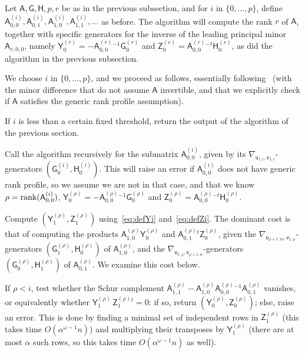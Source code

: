 \documentclass{sig-alternate}
\newcommand{\vu}{\ensuremath{\mathsf{u}}}
\newcommand{\vv}{\ensuremath{\mathsf{v}}}
\newcommand{\mA}{\ensuremath{\mathsf{A}}}
\newcommand{\mG}{\ensuremath{\mathsf{G}}}
\newcommand{\mH}{\ensuremath{\mathsf{H}}}
\newcommand{\mY}{\ensuremath{\mathsf{Y}}}
\newcommand{\mZ}{\ensuremath{\mathsf{Z}}}
\begin{document}
Let $\mA,\mG,\mH,p,r$ be as in the previous subsection, and for $i$ in
$\{0,\dots,p\}$, define
${\mA^{(i)}_{0,0}},\mA^{(i)}_{0,1},\mA^{(i)}_{1,0},\mA^{(i)}_{1,1},\dots$ as before.
The algorithm will compute the rank $r$ of $\mA$, together with
specific generators for the inverse of the leading principal minor
$\mA_{r,0,0}$, namely $\mY^{(r)}_0=-\mA^{(r)}_{0,0}{}^{-1} \mG^{(r)}_0$ and
  $\mZ^{(r)}_0=\mA^{(r)}_{0,0}{}^{-t}\mH^{(r)}_0$, as did the algorithm in the
  previous subsection.

We choose $i$ in $\{0,\dots,p\}$, and we proceed as follows,
essentially following~\cite{JeMo10} (with the minor difference that do
not assume $\mA$ invertible, and that we explicitly check if $\mA$
satisfies the generic rank profile assumption). 

\smallskip{} If $i$ is less than a certain fixed threshold, return the
output of the algorithm of the previous section.

\smallskip{} Call the algorithm recursively for the
submatrix ${\mA^{(i)}_{0,0}}$, given by its
$\nabla_{\vu_{1:i},\vv_{1:i}}$-generators
$(\mG^{(i)}_0,\mH^{(i)}_0)$. This will raise an error if
${\mA^{(i)}_{0,0}}$ does not have generic rank profile, so we assume
we are not in that case, and that we know $\rho={\rm
  rank}({\mA^{(i)}_{0,0}})$, $\mY^{(\rho)}_0=-\mA^{(\rho)}_{0,0}{}^{-1}
\mG^{(\rho)}_0$ and $\mZ^{(\rho)}_0=\mA^{(\rho)}_{0,0}{}^{-t}\mH^{(\rho)}_0$.

\smallskip{} Compute $(\mY^{(\rho)}_1,\mZ^{(\rho)}_1)$
using~\eqref{eq:defYi} and~\eqref{eq:defZi}. The dominant cost is that
of computing the products $\mA^{(\rho)}_{1,0} \mY^{(\rho)}_0$ and
$\mA^{(\rho)}_{0,1}{}^t \mZ^{(\rho)}_0$, given the
$\nabla_{\vu_{\rho+1:m},\vv_{1:\rho}}$-generators
$(\mG^{(\rho)}_1,\mH^{(\rho)}_0)$ of $\mA^{(\rho)}_{1,0}$, and the
$\nabla_{\vu_{1:\rho},\vv_{\rho+1:n}}$-generators
$(\mG^{(\rho)}_0,\mH^{(\rho)}_1)$ of $\mA^{(\rho)}_{0,1}$.  We examine this cost
below.

\smallskip{} If $\rho < i$, test whether the Schur
complement $ \mA^{(\rho)}_{1,1} - \mA^{(\rho)}_{1,0} \mA^{(\rho)}_{0,0}{}^{-1} \mA^{(\rho)}_{0,1}$ vanishes, or
equivalently whether $\mY^{(\rho)}_1\,
\mZ^{(\rho)}_1{}^t = 0$: if so, return $(\mY^{(\rho)}_0,\mZ^{(\rho)}_0)$; else,
raise an error. This is done by finding a minimal set of
independent rows in $\mZ^{(\rho)}_1$ (this takes time $O(\alpha^{\omega-1}
n)$) and multiplying their transposes  by ${\mY^{(\rho)}_1}$ (there are at most
$\alpha$ such rows, so this takes time $O(\alpha^{\omega-1} n)$ as
well).
\end{document}
